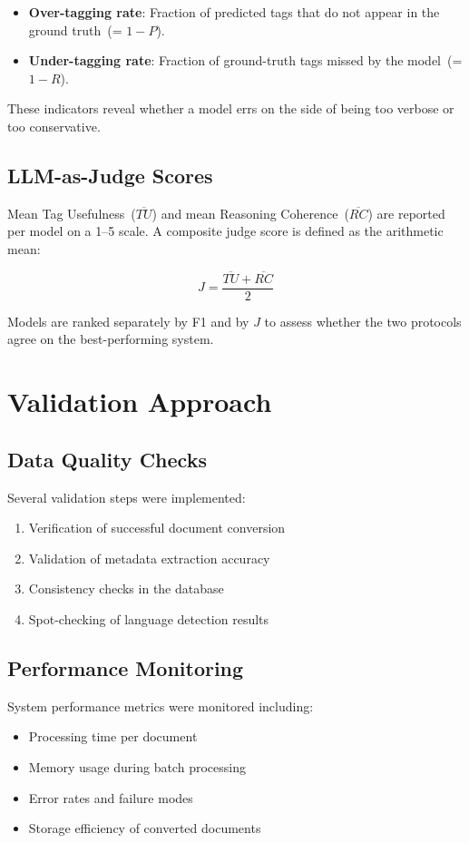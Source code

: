 \begin{itemize}
    \item \textbf{Over-tagging rate}: Fraction of predicted tags that do not
          appear in the ground truth~(= $1-P$).
    \item \textbf{Under-tagging rate}: Fraction of ground-truth tags missed
          by the model~(= $1-R$).
\end{itemize}

These indicators reveal whether a model errs on the side of being too verbose
or too conservative.

\subsection{LLM-as-Judge Scores}
%
Mean Tag Usefulness~($\overline{TU}$) and mean Reasoning Coherence~($\overline{RC}$)
are reported per model on a 1--5 scale.  A composite judge score is defined
as the arithmetic mean:

\begin{equation}
    J = \frac{\overline{TU} + \overline{RC}}{2}
\end{equation}

Models are ranked separately by F1 and by $J$ to assess whether the two
protocols agree on the best-performing system.

\section{Validation Approach}
%
\subsection{Data Quality Checks}
%
Several validation steps were implemented:
\begin{enumerate}
    \item Verification of successful document conversion
    \item Validation of metadata extraction accuracy
    \item Consistency checks in the database
    \item Spot-checking of language detection results
\end{enumerate}

\subsection{Performance Monitoring}
%
System performance metrics were monitored including:
\begin{itemize}
    \item Processing time per document
    \item Memory usage during batch processing
    \item Error rates and failure modes
    \item Storage efficiency of converted documents
\end{itemize}

